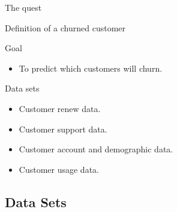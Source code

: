 \documentclass[10pt]{beamer}
\begin{document}
      \begin{frame}{The quest}
        \begin{block}{Definition of a churned customer}
        \end{block}
        \pause
        \begin{block}{Goal}
            \begin{itemize}
              \item To predict which customers will churn.
            \end{itemize}
        \end{block}
        \pause
        \begin{block}{Data sets}
          \begin{itemize}
            \item Customer renew data.
            \item Customer support data.
            \item Customer account and demographic data.
            \item Customer usage data.
          \end{itemize}
        \end{block}
      \end{frame}

  \subsection{Data Sets}
\end{document}
